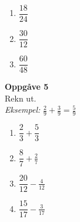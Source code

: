 \documentclass[english,hidelinks,pdftex, 11 pt, class=report,crop=false]{standalone}
\begin{document}
\begin{enumerate}[label=\alph*)]
	\item $\displaystyle \dfrac{18}{24} $\\[10pt]
	\item $\displaystyle \dfrac{30}{12}$\\[10pt]
	\item $\displaystyle \dfrac{60}{48} $\\[10pt]
\end{enumerate}

{\Large \textbf{Oppgåve 5}}\\[10pt]
Rekn ut. \\[10pt]
\textit{Eksempel:} $ \displaystyle
\frac{2}{9}+\frac{3}{9}=\frac{5}{9} $ \\[10pt]
\begin{enumerate}[label=\alph*)]
	\item $\displaystyle \dfrac{2}{3}+\dfrac{5}{3} $\\[10pt]
	\item $\displaystyle \dfrac{8}{7}+\frac{2}{7} $\\[10pt]
	\item $\displaystyle \dfrac{20}{12}-\frac{4}{12} $\\[10pt]
	\item $\displaystyle \dfrac{15}{17}-\frac{3}{17}$\\[10pt]	
\end{enumerate}
\end{document}
